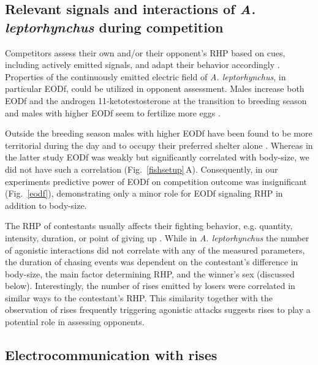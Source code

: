 \documentclass[vruler,JEB]{COB}%
\newcommand{\lepto}{\textit{A. leptorhynchus}}
\newcommand{\panel}[1]{\textsf{#1}}
\newcommand{\fref}[1]{\textup{\ref{#1}}}
\newcommand{\subfref}[2]{\textup{\ref{#1}}\,\panel{#2}}
\newcommand{\Figb}{Fig.}
\newcommand{\Figrefb}[1]{\Figb~\fref{#1}}
\newcommand{\Subfigrefb}[2]{\Figb~\subfref{#1}{#2}}
\begin{document}
\subsection{Relevant signals and interactions of \lepto{} during competition}

Competitors assess their own and/or their opponent's RHP based on cues, including actively emitted signals, and adapt their behavior accordingly \citep{Cluttonbrock1979, Enquist1990, Payne1998, ArnottElwood2009}. Properties of the continuously emitted electric field of \lepto{}, in particular EODf, could be utilized in opponent assessment. Males increase both EODf and the androgen 11-ketotestosterone at the transition to breeding season \citep{Cuddy2012} and males with higher EODf seem to fertilize more eggs \citep{Hagedorn1985, Henninger2018}. 

Outside the breeding season males with higher EODf have been found to be more territorial during the day \citep{Raab2019} and to occupy their preferred shelter alone \citep{Dunlap2002}. Whereas in the latter study EODf was weakly but significantly correlated with body-size, we did not have such a correlation (\Subfigrefb{fishsetup}{A}). Consequently, in our experiments predictive power of EODf on competition outcome was insignificant (\Figrefb{eodf}), demonstrating only a minor role for EODf signaling RHP in addition to body-size.

The RHP of contestants usually affects their fighting behavior, e.g. quantity, intensity, duration, or point of giving up \citep{ArnottElwood2009, Taylor2001, Briffa2004}.
While in \lepto{} the number of agonistic interactions did not correlate with any of the measured parameters, the duration of chasing events was dependent on the contestant's difference in body-size, the main factor determining RHP, and the winner's sex (discussed below). Interestingly, the number of rises emitted by losers were correlated in similar ways to the contestant's RHP. This similarity together with the observation of rises frequently triggering agonistic attacks suggests rises to play a potential role in assessing opponents.

\subsection{Electrocommunication with rises}
\end{document}
